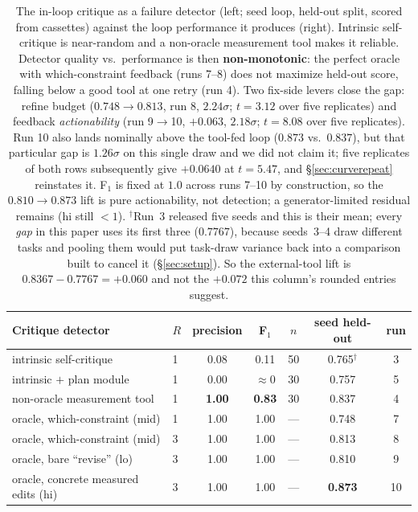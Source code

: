 \documentclass[11pt]{article}
\begin{document}
\begin{table}[h]
\centering
\small
\begin{tabular}{llccccc}
\toprule
Critique detector & $R$ & precision & F$_1$ & $n$ & seed held-out & run \\
\midrule
intrinsic self-critique & 1 & 0.08 & 0.11 & 50 & 0.765$^{\dagger}$ & 3 \\
intrinsic $+$ plan module & 1 & 0.00 & $\approx 0$ & 30 & 0.757 & 5 \\
non-oracle measurement tool & 1 & \textbf{1.00} & \textbf{0.83} & 30 & 0.837 & 4 \\
oracle, which-constraint (mid) & 1 & 1.00 & 1.00 & --- & 0.748 & 7 \\
oracle, which-constraint (mid) & 3 & 1.00 & 1.00 & --- & 0.813 & 8 \\
oracle, bare ``revise'' (lo) & 3 & 1.00 & 1.00 & --- & 0.810 & 9 \\
oracle, concrete measured edits (hi) & 3 & 1.00 & 1.00 & --- & \textbf{0.873} & 10 \\
\bottomrule
\end{tabular}
\caption{The in-loop critique as a failure detector (left; seed loop, held-out split, scored
from cassettes) against the loop performance it produces (right). Intrinsic self-critique is
near-random and a non-oracle measurement tool makes it reliable. Detector quality vs.\ performance is then
\textbf{non-monotonic}: the perfect oracle with which-constraint feedback (runs 7--8) does not
maximize held-out score, falling below a good tool at one retry (run 4). Two fix-side levers
close the gap: refine budget ($0.748\!\to\!0.813$, run 8, $2.24\sigma$; $t = 3.12$ over five replicates)
and feedback \emph{actionability} (run 9$\to$10, $+0.063$, $2.18\sigma$; $t = 8.08$ over five replicates). Run 10 also lands nominally above
the tool-fed loop ($0.873$ vs.\ $0.837$), but that particular gap is
$1.26\sigma$ on this single draw and we did not claim it; five replicates of both rows
subsequently give $+0.0640$ at $t = 5.47$, and \S\ref{sec:curverepeat} reinstates it. F$_1$ is fixed at $1.0$ across runs
7--10 by construction, so the $0.810\!\to\!0.873$ lift is pure actionability, not detection;
a generator-limited residual remains (hi still $<1$). $^{\dagger}$Run~3 released five seeds and
this is their mean; every \emph{gap} in this paper uses its first three
($0.7767$), because seeds~3--4 draw different tasks and pooling them would put task-draw
variance back into a comparison built to cancel it (\S\ref{sec:setup}). So the external-tool
lift is $0.8367 - 0.7767 = +0.060$ and not the $+0.072$ this column's rounded entries suggest.}
\label{tab:curve}
\end{table}
\end{document}
